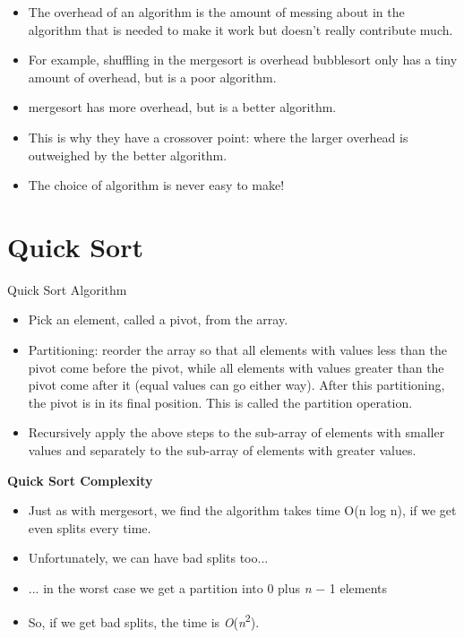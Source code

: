 \documentclass{beamer}
\begin{document}
\begin{frame}
\begin{itemize}
\item The overhead of an algorithm is the amount of messing about in the algorithm that is needed to make it work but
doesn't really contribute much.
\item For example, shuffling in the mergesort is overhead bubblesort only has a tiny amount of overhead, but is a poor
algorithm.
\item mergesort has more overhead, but is a better algorithm.
\item This is why they have a crossover point: where the larger overhead is outweighed by the better algorithm.
\item The choice of algorithm is never easy to make!
\end{itemize}

\end{frame} 

\section{Quick Sort}
\begin{frame}

Quick Sort Algorithm

\begin{itemize}
\item Pick an element, called a pivot, from the array.
\item Partitioning: reorder the array so that all elements with values less than the pivot come before the pivot, while all elements with values greater than the pivot come after it (equal values can go either way). After this partitioning, the pivot is in its final position. This is called the partition operation.
\item Recursively apply the above steps to the sub-array of elements with smaller values and separately to the sub-array of elements with greater values.
\end{itemize}

\end{frame} 

\begin{frame}
\begin{center}
\textbf{Quick Sort Complexity}
\end{center}
\begin{itemize}
\item Just as with mergesort, we find the algorithm takes time O(n log n), if we get even splits every time.
\item Unfortunately, we can have bad splits too...
\item ... in the worst case we get a partition into 0 plus \textit{n }$-$ 1 elements
\item So, if we get bad splits, the time is \textit{O}(\textit{n}\textsuperscript{2}). 
\end{itemize}
\end{frame} 
\end{document}
